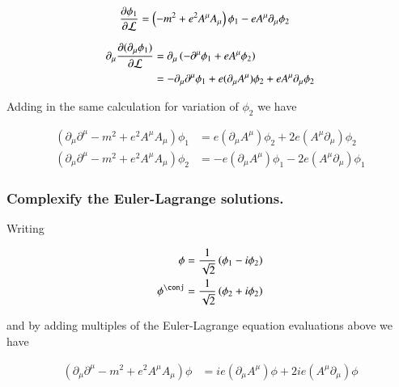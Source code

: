 \documentclass{article}
\begin{document}
\begin{align*}
\frac{\partial{\phi_1}}{\partial {\mathcal{L}}} &= \left( -m^2 + e^2 A^\mu A_\mu \right) \phi_1 - e A^\mu \partial_\mu \phi_2 
\end{align*}

\begin{align*}
\partial_\mu \frac{\partial{(\partial_\mu \phi_1)}}{\partial {\mathcal{L}}} 
&=
\partial_\mu \left( -\partial^\mu \phi_1 + e A^\mu \phi_2 \right) \\
&=
-\partial_\mu \partial^\mu \phi_1 
+ e (\partial_\mu A^\mu) \phi_2 
+ e A^\mu \partial_\mu \phi_2 
\\
\end{align*}

Adding in the same calculation for variation of $\phi_2$ we have

\begin{align*}
\left( \partial_\mu \partial^\mu -m^2 + e^2 A^\mu A_\mu \right) \phi_1 &= e (\partial_\mu A^\mu) \phi_2 + 2 e (A^\mu \partial_\mu) \phi_2  \\
\left( \partial_\mu \partial^\mu -m^2 + e^2 A^\mu A_\mu \right) \phi_2 &= -e (\partial_\mu A^\mu) \phi_1 - 2 e (A^\mu \partial_\mu) \phi_1 
\end{align*}

%
\subsubsection{ Complexify the Euler-Lagrange solutions. }

Writing

\begin{align*}
\phi &= \inv{\sqrt{2}}\left( \phi_1 - i \phi_2 \right) \\
\phi^\conj &= \inv{\sqrt{2}}\left( \phi_2 + i \phi_2 \right) \\
\end{align*}

and by adding multiples of the Euler-Lagrange equation evaluations above we have

\begin{align}\label{eqn:complexifiedSolution}
\left( \partial_\mu \partial^\mu -m^2 + e^2 A^\mu A_\mu \right) \phi &= i e (\partial_\mu A^\mu) \phi + 2 i e (A^\mu \partial_\mu) \phi 
\end{align}
\end{document}
